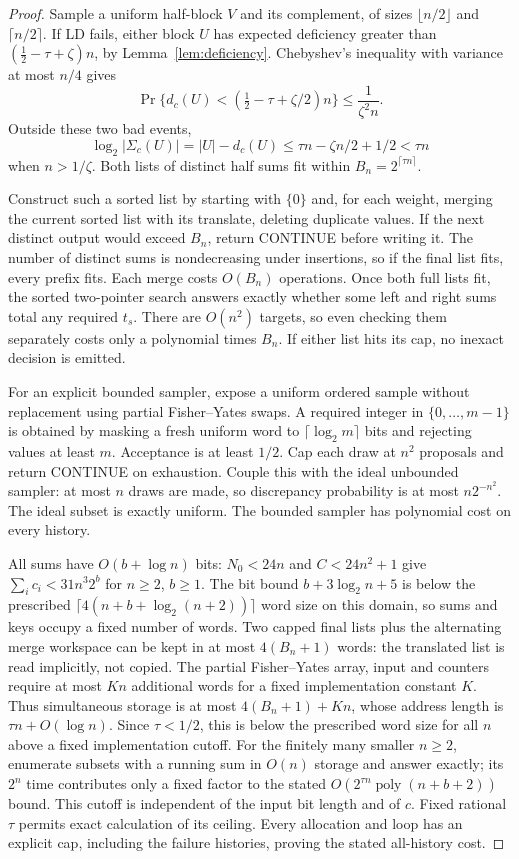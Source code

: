 \begin{proof}
Sample a uniform half-block $V$ and its complement, of sizes
$\lfloor n/2\rfloor$ and $\lceil n/2\rceil$. If LD fails, either
block $U$ has expected deficiency greater than
$(\tfrac12-\tau+\zeta)n$, by Lemma~\ref{lem:deficiency}.
Chebyshev's inequality with variance at most $n/4$ gives
\[
 \Pr\{d_c(U)<(\tfrac12-\tau+\zeta/2)n\}
 \le \frac1{\zeta^2n}.
\]
Outside these two bad events,
\[
 \log_2|\Sigma_c(U)|=|U|-d_c(U)
 \le\tau n-\zeta n/2+1/2<\tau n
\]
when $n>1/\zeta$. Both lists of distinct half sums fit within
$B_n=2^{\lceil\tau n\rceil}$.

Construct such a sorted list by starting with $\{0\}$ and, for each
weight, merging the current sorted list with its translate, deleting
duplicate values. If the next distinct output would exceed $B_n$,
return CONTINUE before writing it. The number of distinct sums is
nondecreasing under insertions, so if the final list fits, every prefix
fits. Each merge costs $O(B_n)$ operations. Once both full lists fit,
the sorted two-pointer search answers exactly whether some left and
right sums total any required $t_s$. There are $O(n^2)$ targets, so
even checking them separately costs only a polynomial times $B_n$.
If either list hits its cap, no inexact decision is emitted.

For an explicit bounded sampler, expose a uniform ordered sample
without replacement using partial Fisher--Yates swaps. A required
integer in $\{0,\ldots,m-1\}$ is obtained by masking a fresh uniform
word to $\lceil\log_2m\rceil$ bits and rejecting values at least $m$.
Acceptance is at least $1/2$. Cap each draw at $n^2$ proposals and
return CONTINUE on exhaustion. Couple this with the ideal unbounded
sampler: at most $n$ draws are made, so discrepancy probability is at
most $n2^{-n^2}$. The ideal subset is exactly uniform. The bounded
sampler has polynomial cost on every history.

All sums have $O(b+\log n)$ bits: $N_0<24n$ and $C<24n^2+1$
give $\sum_i c_i<31n^3 2^b$ for $n\ge2$, $b\ge1$.
The bit bound $b+3\log_2n+5$ is below the prescribed
$\lceil4(n+b+\log_2(n+2))\rceil$ word size on this domain, so sums
and keys occupy a fixed number of words. Two capped final lists plus
the alternating merge workspace can be kept in at most $4(B_n+1)$
words: the translated list is read implicitly, not copied. The partial
Fisher--Yates array, input and counters require at most $K n$ additional
words for a fixed implementation constant $K$. Thus simultaneous
storage is at most $4(B_n+1)+K n$, whose address length is
$\tau n+O(\log n)$. Since $\tau<1/2$, this is below the prescribed
word size for all $n$ above a fixed implementation cutoff. For the
finitely many smaller $n\ge2$, enumerate subsets with a running sum
in $O(n)$ storage and answer exactly; its $2^n$ time contributes only
a fixed factor to the stated $O(2^{\tau n}\operatorname{poly}(n+b+2))$
bound. This cutoff is independent of the input bit length and of $c$.
Fixed rational $\tau$ permits exact calculation of its ceiling.
Every allocation and loop has an explicit cap,
including the failure histories, proving the stated all-history cost.
\end{proof}

